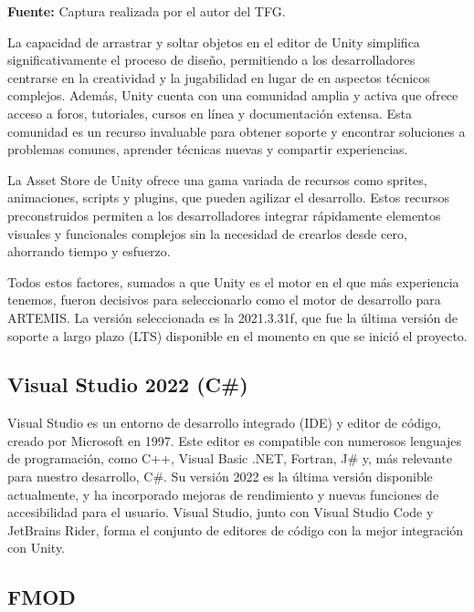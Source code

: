 \begin{center}
	\textbf{Fuente:} Captura realizada por el autor del TFG.
\end{center}

La capacidad de arrastrar y soltar objetos en el editor de Unity simplifica significativamente el proceso de diseño, permitiendo a los desarrolladores centrarse en la creatividad y la jugabilidad en lugar de en aspectos técnicos complejos. Además, Unity cuenta con una comunidad amplia y activa que ofrece acceso a foros, tutoriales, cursos en línea y documentación extensa. Esta comunidad es un recurso invaluable para obtener soporte y encontrar soluciones a problemas comunes, aprender técnicas nuevas y compartir experiencias.

La Asset Store de Unity ofrece una gama variada de recursos como sprites, animaciones, scripts y plugins, que pueden agilizar el desarrollo. Estos recursos preconstruidos permiten a los desarrolladores integrar rápidamente elementos visuales y funcionales complejos sin la necesidad de crearlos desde cero, ahorrando tiempo y esfuerzo.

Todos estos factores, sumados a que Unity es el motor en el que más experiencia tenemos, fueron decisivos para seleccionarlo como el motor de desarrollo para ARTEMIS. La versión seleccionada es la 2021.3.31f, que fue la última versión de soporte a largo plazo (LTS) disponible en el momento en que se inició el proyecto.

\subsection{Visual Studio 2022 (C\#)}

Visual Studio es un entorno de desarrollo integrado (IDE) y editor de código, creado por Microsoft en 1997. Este editor es compatible con numerosos lenguajes de programación, como C++, Visual Basic .NET, Fortran, J\# y, más relevante para nuestro desarrollo, C\#. Su versión 2022 es la última versión disponible actualmente, y ha incorporado mejoras de rendimiento y nuevas funciones de accesibilidad para el usuario. Visual Studio, junto con Visual Studio Code y JetBrains Rider, forma el conjunto de editores de código con la mejor integración con Unity.

\subsection{FMOD}

